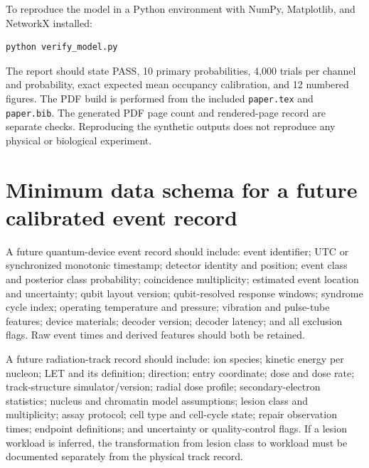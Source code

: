 \documentclass[11pt,a4paper,oneside]{article}
\begin{document}
To reproduce the model in a Python environment with NumPy, Matplotlib, and NetworkX installed:
\begin{verbatim}
python verify_model.py
\end{verbatim}
The report should state PASS, 10 primary probabilities, 4,000 trials per channel and probability, exact expected mean occupancy calibration, and 12 numbered figures. The PDF build is performed from the included \texttt{paper.tex} and \texttt{paper.bib}. The generated PDF page count and rendered-page record are separate checks. Reproducing the synthetic outputs does not reproduce any physical or biological experiment.

\section{Minimum data schema for a future calibrated event record}
A future quantum-device event record should include: event identifier; UTC or synchronized monotonic timestamp; detector identity and position; event class and posterior class probability; coincidence multiplicity; estimated event location and uncertainty; qubit layout version; qubit-resolved response windows; syndrome cycle index; operating temperature and pressure; vibration and pulse-tube features; device materials; decoder version; decoder latency; and all exclusion flags. Raw event times and derived features should both be retained.

A future radiation-track record should include: ion species; kinetic energy per nucleon; LET and its definition; direction; entry coordinate; dose and dose rate; track-structure simulator/version; radial dose profile; secondary-electron statistics; nucleus and chromatin model assumptions; lesion class and multiplicity; assay protocol; cell type and cell-cycle state; repair observation times; endpoint definitions; and uncertainty or quality-control flags. If a lesion workload is inferred, the transformation from lesion class to workload must be documented separately from the physical track record.
\end{document}
